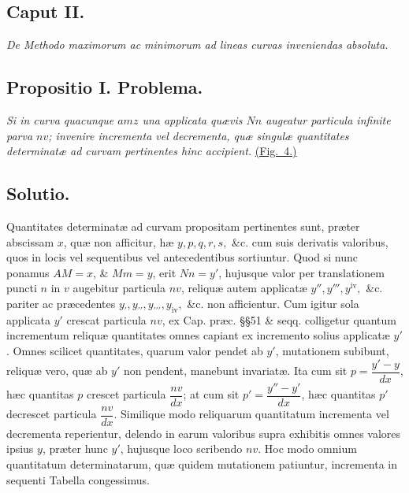 \subsection*{Caput II.}
\textit{De Methodo maximorum ac minimorum ad lineas curvas inveniendas absoluta.}

\subsection*{Propositio I. Problema.}
\textit{Si in curva quacunque $amz$ una applicata quævis $Nn$ augeatur particula infinite parva $nv$; invenire incrementa vel decrementa, quæ singulæ quantitates determinatæ ad curvam pertinentes hinc accipient.} \hyperlink{fig:4}{(Fig.~4.)}

\subsection*{Solutio.}
Quantitates determinatæ ad curvam propositam pertinentes sunt, præter abscissam $x$, quæ non afficitur, hæ $y,p,q,r,s,$ \&c. cum suis derivatis valoribus, quos in locis vel sequentibus vel antecedentibus sortiuntur. Quod si nunc ponamus $AM=x$, \& $Mm=y$, erit $Nn=y'$, hujusque valor per translationem puncti $n$ in $v$ augebitur particula $nv$, reliquæ autem applicatæ $y'',y''',y^{\mathrm{iv}},$ \&c. pariter ac præcedentes $y_{\prime},y_{\prime\prime},y_{\prime\prime\prime},y_{\mathrm{iv}},$ \&c. non afficientur. Cum igitur sola applicata $y'$ crescat particula $nv$, ex Cap. præc. §§51 \& seqq. colligetur quantum incrementum reliquæ quantitates omnes capiant ex incremento solius applicatæ $y'$. Omnes scilicet quantitates, quarum valor pendet ab $y'$, mutationem subibunt, reliquæ vero, quæ ab $y'$ non pendent, manebunt invariatæ. Ita cum sit $p=\dfrac{y'-y}{dx}$, hæc quantitas $p$ crescet particula $\dfrac{nv}{dx}$; at cum sit $p'=\dfrac{y''-y'}{dx}$, hæc quantitas $p'$ decrescet particula $\dfrac{nv}{dx}$. Similique modo reliquarum quantitatum incrementa vel decrementa reperientur, delendo in earum valoribus supra exhibitis omnes valores ipsius $y$, præter hunc $y'$, hujusque loco scribendo $nv$. Hoc modo omnium quantitatum determinatarum, quæ quidem mutationem patiuntur, incrementa in sequenti Tabella congessimus.

